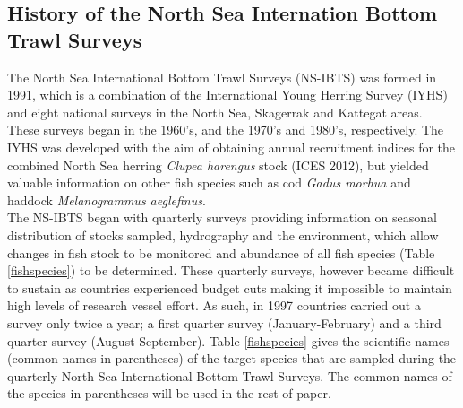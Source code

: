\documentclass[a4paper 12pt]{article}
\numberwithin{equation}{section}
\begin{document}
\subsection{History of the North Sea Internation Bottom Trawl Surveys}
\indent The North Sea International Bottom Trawl Surveys (NS-IBTS) was formed in 1991, which is a combination of the International Young Herring Survey (IYHS) and eight national surveys in the North Sea, Skagerrak and Kattegat areas. These surveys began in the 1960's, and the 1970's and 1980's, respectively. The IYHS was developed with the aim of obtaining annual recruitment indices for the combined North Sea herring \emph{Clupea harengus} stock (ICES 2012), but yielded valuable information on other fish species such as cod \emph{Gadus morhua} and haddock \emph{Melanogrammus aeglefinus}.\\
\indent The NS-IBTS began with quarterly surveys providing information on seasonal distribution of stocks sampled, hydrography and the environment, which allow changes in fish stock to be monitored and abundance of all fish species  (Table \ref{fishspecies}) to be determined. These quarterly surveys, however became difficult to sustain as countries experienced budget cuts making it impossible to maintain high levels of research vessel effort. As such, in 1997 countries carried out a survey only twice a year; a first quarter survey (January-February) and a third quarter survey (August-September). Table \ref{fishspecies} gives the scientific names (common names in parentheses) of the target species that are sampled during the quarterly North Sea International Bottom Trawl Surveys. The common names of the species in parentheses will be used in the rest of paper.\\

\end{document}
